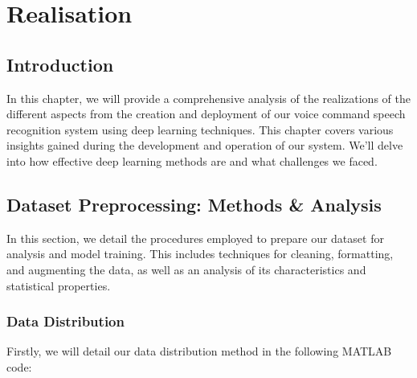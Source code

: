 \documentclass[a4paper]{report}
\begin{document}
{\chapter{Realisation}
\section{Introduction}
In this chapter, we will provide a comprehensive analysis of the realizations of the different aspects from the creation and deployment of our voice command speech recognition system using deep learning techniques. This chapter covers various insights gained during the development and operation of our system. We'll delve into how effective deep learning methods are and what challenges we faced.
\section{Dataset Preprocessing: Methods \& Analysis}
In this section, we detail the procedures employed to prepare our dataset for analysis and model training. This includes techniques for cleaning, formatting, and augmenting the data, as well as an analysis of its characteristics and statistical properties.
\subsection{Data Distribution}
Firstly, we will detail our data distribution method in the following MATLAB code:
\begin{center}
\end{center}}
\end{document}
